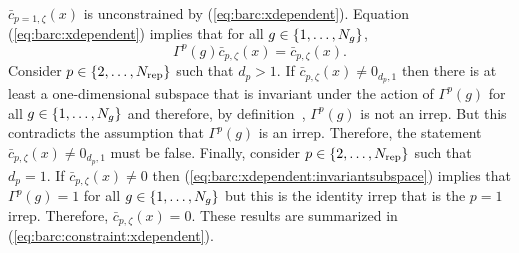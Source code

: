 $\bar c_{p=1,\zeta}(x)$ is unconstrained by (\ref{eq:barc:xdependent}). %
Equation (\ref{eq:barc:xdependent}) %
implies that for all
$g\in\{1,\dots,N_g\}$,
\begin{equation}
\Gamma^p(g)
\bar c_{p,\zeta}(x)
=
\bar c_{p,\zeta}(x)
\label{eq:barc:xdependent:invariantsubspace}
.
\end{equation}
Consider $p\in\{2,\dots,N_{\rm rep}\}$ such that $d_p>1$.
If $\bar c_{p,\zeta}(x)\neq 0_{d_p,1}$ then there is at least a
one-dimensional subspace that is invariant under the action of
$\Gamma^p(g)$ for all $g\in\{1,\dots,N_g\}$ and therefore, by
definition~\cite[p.~67]{Miller1972}, $\Gamma^p(g)$ is not an irrep.
But this contradicts the assumption that $\Gamma^p(g)$ is an irrep.
Therefore, the statement $\bar c_{p,\zeta}(x)\neq 0_{d_p,1}$ must be false.
Finally, consider $p\in\{2,\dots,N_{\rm rep}\}$ such that $d_p=1$.
If $\bar c_{p,\zeta}(x)\neq 0$ then
(\ref{eq:barc:xdependent:invariantsubspace}) %
implies that $\Gamma^p(g)=1$
for all $g\in\{1,\dots,N_g\}$ but this is the identity irrep that is
the $p=1$ irrep.
Therefore, $\bar c_{p,\zeta}(x)=0$.
These results are summarized in
(\ref{eq:barc:constraint:xdependent}). %
